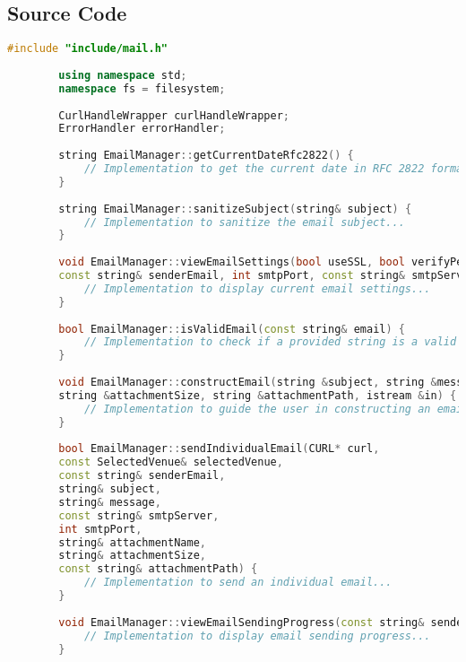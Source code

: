 \documentclass{article}
\begin{document}
	\subsection*{Source Code}
	\begin{mdframed}[backgroundcolor=background, hidealllines=false, innerleftmargin=15pt, innerrightmargin=5pt, innertopmargin=0pt, innerbottommargin=-5pt]
	\begin{lstlisting}[language=C++]
		#include "include/mail.h"
		
		using namespace std;
		namespace fs = filesystem;
		
		CurlHandleWrapper curlHandleWrapper;
		ErrorHandler errorHandler;
		
		string EmailManager::getCurrentDateRfc2822() {
			// Implementation to get the current date in RFC 2822 format...
		}
		
		string EmailManager::sanitizeSubject(string& subject) {
			// Implementation to sanitize the email subject...
		}
		
		void EmailManager::viewEmailSettings(bool useSSL, bool verifyPeer, bool verifyHost, bool verbose,
		const string& senderEmail, int smtpPort, const string& smtpServer) {
			// Implementation to display current email settings...
		}
		
		bool EmailManager::isValidEmail(const string& email) {
			// Implementation to check if a provided string is a valid email format...
		}
		
		void EmailManager::constructEmail(string &subject, string &message, string &attachmentName, 
		string &attachmentSize, string &attachmentPath, istream &in) {
			// Implementation to guide the user in constructing an email...
		}
		
		bool EmailManager::sendIndividualEmail(CURL* curl,
		const SelectedVenue& selectedVenue,
		const string& senderEmail,
		string& subject,
		string& message,
		const string& smtpServer,
		int smtpPort,
		string& attachmentName,
		string& attachmentSize,
		const string& attachmentPath) {
			// Implementation to send an individual email...
		}
		
		void EmailManager::viewEmailSendingProgress(const string& senderEmail) {
			// Implementation to display email sending progress...
		}
	\end{lstlisting}
\end{mdframed}
	
\end{document}
